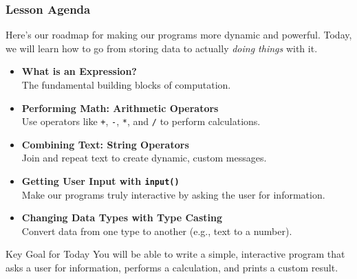 \documentclass{beamer}
\begin{document}
\begin{frame}[fragile]
    \frametitle{Lesson Agenda}
    
    Here's our roadmap for making our programs more dynamic and powerful. Today, we will learn how to go from storing data to actually \textit{doing things} with it.
    
    \begin{itemize}
        \item \textbf{What is an Expression?} \\
        The fundamental building blocks of computation.
        
        \item \textbf{Performing Math: Arithmetic Operators} \\
        Use operators like \texttt{+}, \texttt{-}, \texttt{*}, and \texttt{/} to perform calculations.
        
        \item \textbf{Combining Text: String Operators} \\
        Join and repeat text to create dynamic, custom messages.
        
        \item \textbf{Getting User Input with \texttt{input()}} \\
        Make our programs truly interactive by asking the user for information.
        
        \item \textbf{Changing Data Types with Type Casting} \\
        Convert data from one type to another (e.g., text to a number).
    \end{itemize}
    
    \begin{block}{Key Goal for Today}
        You will be able to write a simple, interactive program that asks a user for information, performs a calculation, and prints a custom result.
    \end{block}

\end{frame}
\end{document}
